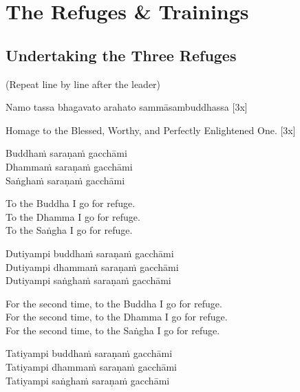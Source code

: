 \section{The Refuges \& Trainings}

\vspace{1em}

\subsection{Undertaking the Three Refuges}

  (Repeat line by line after the leader)\hyperlink{endnote135-appendix}{\hypertarget{endnote135-body}{}}

Namo tassa bhagavato arahato sammāsambuddhassa \hfill{[3x]}

\begin{english}
  Homage to the Blessed, Worthy, and Perfectly Enlightened One. \hfill{[3x]}
\end{english}

Buddhaṁ saraṇaṁ gacchāmi\\
Dhammaṁ saraṇaṁ gacchāmi\\
Saṅghaṁ saraṇaṁ gacchāmi

\begin{english-verses}
  To the Buddha I go for refuge.\\
  To the Dhamma I go for refuge.\\
  To the Saṅgha I go for refuge.
\end{english-verses}

Dutiyampi buddhaṁ saraṇaṁ gacchāmi\\
Dutiyampi dhammaṁ saraṇaṁ gacchāmi\\
Dutiyampi saṅghaṁ saraṇaṁ gacchāmi

\begin{english-verses}
  For the second time, to the Buddha I go for refuge.\\
  For the second time, to the Dhamma I go for refuge.\\
  For the second time, to the Saṅgha I go for refuge.
\end{english-verses}

Tatiyampi buddhaṁ saraṇaṁ gacchāmi\\
Tatiyampi dhammaṁ saraṇaṁ gacchāmi\\
Tatiyampi saṅghaṁ saraṇaṁ gacchāmi

